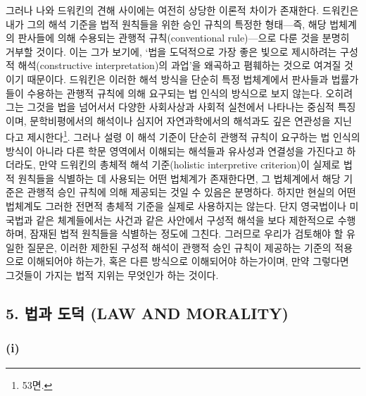 그러나 나와 드워킨의 견해 사이에는 여전히 상당한 이론적 차이가 존재한다.
드워킨은 내가 그의 해석 기준을 법적 원칙들을 위한 승인 규칙의 특정한
형태---즉, 해당 법체계의 판사들에 의해 수용되는 관행적 규칙(conventional
rule)---으로 다룬 것을 분명히 거부할 것이다. 이는 그가 보기에, `법을
도덕적으로 가장 좋은 빛으로 제시하려는 구성적 해석(constructive
interpretation)의 과업'을 왜곡하고 폄훼하는 것으로 여겨질 것이기
때문이다. 드워킨은 이러한 해석 방식을 단순히 특정 법체계에서 판사들과
법률가들이 수용하는 관행적 규칙에 의해 요구되는 법 인식의 방식으로 보지
않는다. 오히려 그는 그것을 법을 넘어서서 다양한 사회사상과 사회적
실천에서 나타나는 중심적 특징이며, 문학비평에서의 해석이나 심지어
자연과학에서의 해석과도 깊은 연관성을 지닌다고 제시한다\footnote{
  53면.}. 그러나 설령 이 해석 기준이 단순히 관행적 규칙이 요구하는 법
인식의 방식이 아니라 다른 학문 영역에서 이해되는 해석들과 유사성과
연결성을 가진다고 하더라도, 만약 드워킨의 총체적 해석 기준(holistic
interpretive criterion)이 실제로 법적 원칙들을 식별하는 데 사용되는 어떤
법체계가 존재한다면, 그 법체계에서 해당 기준은 관행적 승인 규칙에 의해
제공되는 것일 수 있음은 분명하다. 하지만 현실의 어떤 법체계도 그러한
전면적 총체적 기준을 실제로 사용하지는 않는다. 단지 영국법이나 미국법과
같은 체계들에서는  사건과 같은 사안에서
구성적 해석을 보다 제한적으로 수행하며, 잠재된 법적 원칙들을 식별하는
정도에 그친다. 그러므로 우리가 검토해야 할 유일한 질문은, 이러한 제한된
구성적 해석이 관행적 승인 규칙이 제공하는 기준의 적용으로 이해되어야
하는가, 혹은 다른 방식으로 이해되어야 하는가이며, 만약 그렇다면 그것들이
가지는 법적 지위는 무엇인가 하는 것이다.

\subsection{5. 법과 도덕 (LAW AND
MORALITY)}\label{uxbc95uxacfc-uxb3c4uxb355-law-and-morality}

\subsubsection{\texorpdfstring{(i) }{(i) 권리와 의무 (Rights and Duties)}}\label{i-uxad8cuxb9acuxc640-uxc758uxbb34-rights-and-duties}

